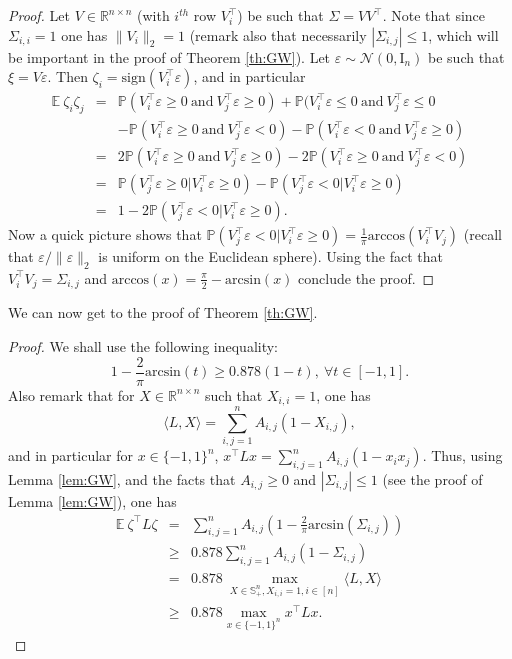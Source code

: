 \documentclass[openany]{now}
\newcommand{\mI}{\mathrm{I}}
\renewcommand{\P}{\mathbb{P}}
\newcommand{\E}{\mathbb{E}}
\newcommand{\R}{\mathbb{R}}
\renewcommand{\epsilon}{\varepsilon}
\begin{document}
\begin{proof}
Let $V \in \R^{n \times n}$ (with $i^{th}$ row $V_i^{\top}$) be such that $\Sigma = V V^{\top}$. Note that since $\Sigma_{i,i}=1$ one has $\|V_i\|_2 = 1$ (remark also that necessarily $|\Sigma_{i,j}| \leq 1$, which will be important in the proof of Theorem \ref{th:GW}). Let $\epsilon \sim \mathcal{N}(0,\mI_n)$ be such that $\xi = V \epsilon$. Then $\zeta_i = \mathrm{sign}(V_i^{\top} \epsilon)$, and in particular
\begin{eqnarray*}
\E \ \zeta_i \zeta_j & = & \P(V_i^{\top} \epsilon \geq 0 \ \text{and} \ V_j^{\top} \epsilon \geq 0) + \P(V_i^{\top} \epsilon \leq 0 \ \text{and} \ V_j^{\top} \epsilon \leq 0 \\
& & - \P(V_i^{\top} \epsilon \geq 0 \ \text{and} \ V_j^{\top} \epsilon < 0) - \P(V_i^{\top} \epsilon < 0 \ \text{and} \ V_j^{\top} \epsilon \geq 0) \\
& = & 2 \P(V_i^{\top} \epsilon \geq 0 \ \text{and} \ V_j^{\top} \epsilon \geq 0) - 2 \P(V_i^{\top} \epsilon \geq 0 \ \text{and} \ V_j^{\top} \epsilon < 0) \\
& = & \P(V_j^{\top} \epsilon \geq 0 | V_i^{\top} \epsilon \geq 0) - \P(V_j^{\top} \epsilon < 0 | V_i^{\top} \epsilon \geq 0) \\
& = & 1 - 2 \P(V_j^{\top} \epsilon < 0 | V_i^{\top} \epsilon \geq 0).
\end{eqnarray*}
Now a quick picture shows that $\P(V_j^{\top} \epsilon < 0 | V_i^{\top} \epsilon \geq 0) = \frac{1}{\pi} \mathrm{arccos}(V_i^{\top} V_j)$ (recall that $\epsilon / \|\epsilon\|_2$ is uniform on the Euclidean sphere). Using the fact that $V_i^{\top} V_j = \Sigma_{i,j}$ and $\mathrm{arccos}(x) = \frac{\pi}{2} - \mathrm{arcsin}(x)$ conclude the proof.
\end{proof}

We can now get to the proof of Theorem \ref{th:GW}.

\begin{proof}
We shall use the following inequality:
\begin{equation} \label{eq:dependsonL}
1 - \frac{2}{\pi} \mathrm{arcsin}(t) \geq 0.878 (1-t), \ \forall t \in [-1,1] .
\end{equation}
Also remark that for $X \in \R^{n \times n}$ such that $X_{i,i}=1$, one has
$$\langle L, X \rangle = \sum_{i,j=1}^n A_{i,j} (1 - X_{i,j}) ,$$
and in particular for $x \in \{-1,1\}^n$, $x^{\top} L x = \sum_{i,j=1}^n A_{i,j} (1 - x_i x_j)$.
Thus, using Lemma \ref{lem:GW}, and the facts that $A_{i,j} \geq 0$ and $|\Sigma_{i,j}| \leq 1$ (see the proof of Lemma \ref{lem:GW}), one has
\begin{eqnarray*}
\E \ \zeta^{\top} L \zeta
& = & \sum_{i,j=1}^n A_{i,j} \left(1- \frac{2}{\pi} \mathrm{arcsin} \left(\Sigma_{i,j}\right)\right)  \\
& \geq & 0.878 \sum_{i,j=1}^n A_{i,j} \left(1- \Sigma_{i,j}\right) \\
& = & 0.878 \ \max_{X \in \mathbb{S}_+^n, X_{i,i}=1, i \in [n]} \langle L, X \rangle \\
& \geq & 0.878 \max_{x \in \{-1,1\}^n} x^{\top} L x .
\end{eqnarray*}
\end{proof}
\end{document}
